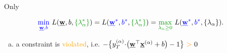 \begin{frame}{Only}
{\begin{block}{}
\begin{enumerate}
	\slidesonly{\vspace{-3mm}}
	\begingroup 
	\footnotesize
	\begin{equation*}
			{\color{blue}\min_{\vec w, b}}~L{(\vec{w}, b, {\color{darkgreen} \{ \lambda_\alpha^*\}})}
			= L{({\color{blue}\vec{w}^*}, {\color{blue}b^*}, {\color{darkgreen} \{ \lambda_\alpha^*\}})}
			= {\color{darkgreen}\max_{ \lambda_\alpha \geq 0}}~L{({\color{blue}\vec{w}^*}, {\color{blue}b^*}, \{ \lambda_\alpha \})}.
	\end{equation*}
	\endgroup

\end{enumerate}

\end{block}%
}

{

\begin{enumerate}[(a)]
	\item<only@2> a constraint is \textcolor{orange}{violated},\slidesonly{\\} i.e.
	\begingroup 
	\footnotesize
	$
	-\big\{ y_{T}^{(\alpha)} \kern-.5ex \cdot \kern-.5ex \big( \vec w^{\top} \vec x^{(\alpha)} + b \big) -1 \big\}~{\color{orange}>}~0
	$
	\endgroup 
	
\end{enumerate}}
\end{frame}
